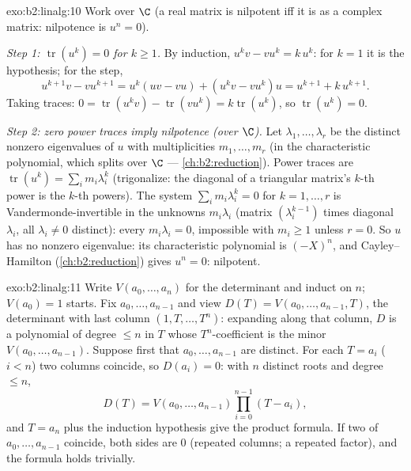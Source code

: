 \begin{solution}{exo:b2:linalg:10}
Work over $\C$ (a real matrix is nilpotent iff it is as a complex
matrix: nilpotence is $u^n = 0$).

\emph{Step 1: $\operatorname{tr}(u^k) = 0$ for $k \geq 1$.} By
induction, $u^k v - v u^k = k\, u^k$: for $k = 1$ it is the
hypothesis; for the step,
\[
u^{k+1}v - vu^{k+1} = u^k(uv - vu) + (u^k v - v u^k)u
= u^{k+1} + k\,u^{k+1} .
\]
Taking traces: $0 = \operatorname{tr}(u^k v) -
\operatorname{tr}(vu^k) = k \operatorname{tr}(u^k)$, so
$\operatorname{tr}(u^k) = 0$.

\emph{Step 2: zero power traces imply nilpotence (over $\C$).} Let
$\lambda_1, \dots, \lambda_r$ be the distinct nonzero eigenvalues of
$u$ with multiplicities $m_1, \dots, m_r$ (in the characteristic
polynomial, which splits over $\C$ ---
\cref{ch:b2:reduction}). Power traces are $\operatorname{tr}(u^k) =
\sum_i m_i \lambda_i^k$ (trigonalize: the diagonal of a triangular
matrix's $k$-th power is the $k$-th powers). The system $\sum_i m_i
\lambda_i^k = 0$ for $k = 1, \dots, r$ is Vandermonde-invertible in
the unknowns $m_i\lambda_i$ (matrix $(\lambda_i^{k-1})$ times
diagonal $\lambda_i$, all $\lambda_i \neq 0$ distinct): every $m_i
\lambda_i = 0$, impossible with $m_i \geq 1$ unless $r = 0$. So $u$
has no nonzero eigenvalue: its characteristic polynomial is
$(-X)^n$, and Cayley--Hamilton (\cref{ch:b2:reduction}) gives $u^n
= 0$: nilpotent.
\end{solution}

\begin{solution}{exo:b2:linalg:11}
Write $V(a_0, \dots, a_n)$ for the determinant and induct on $n$;
$V(a_0) = 1$ starts. Fix $a_0, \dots, a_{n-1}$ and view $D(T) =
V(a_0, \dots, a_{n-1}, T)$, the determinant with last column $(1,
T, \dots, T^n)$: expanding along that column, $D$ is a polynomial
of degree $\leq n$ in $T$ whose $T^n$-coefficient is the minor
$V(a_0, \dots, a_{n-1})$. Suppose first that $a_0, \dots,
a_{n-1}$ are distinct. For each $T = a_i$ ($i < n$) two columns
coincide, so $D(a_i) = 0$: with $n$ distinct roots and degree
$\leq n$,
\[
D(T) = V(a_0, \dots, a_{n-1}) \prod_{i=0}^{n-1}(T - a_i),
\]
and $T = a_n$ plus the induction hypothesis give the product
formula. If two of $a_0, \dots, a_{n-1}$ coincide, both sides are
$0$ (repeated columns; a repeated factor), and the formula holds
trivially.
\end{solution}

